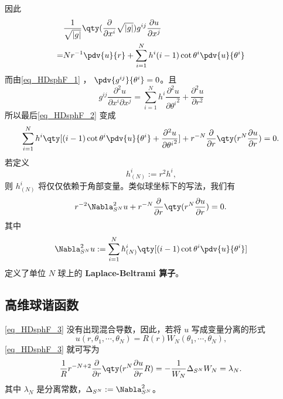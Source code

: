 因此
\begin{equation}
\begin{aligned}
&\frac{1}{\sqrt{ \left\lvert g \right\rvert }} \qty(\frac{\partial }{\partial x^i} \sqrt{ \left\lvert g \right\rvert })g^{ij} \frac{\partial u}{\partial x^j}\\
=&Nr^{-1}\pdv{u}{r}+\sum_{i=1}^{N}h^{i}(i-1)\cot\theta^i\pdv{u}{\theta^i}\\
\end{aligned}~
\end{equation}
而由\autoref{eq_HDsphF_1} ， $\pdv{g^{ij}}{\theta^i}=0$。且
\begin{equation}
g^{ij}\frac{\partial^2 u}{\partial x^i\partial x^j}=\sum_{i=1}^{N}h^{i}\frac{\partial^2 u}{\partial {\theta^i}^2}+\frac{\partial^2 u}{\partial r^2}~
\end{equation}
所以最后\autoref{eq_HDsphF_2} 变成
\begin{equation}
\begin{aligned}
\sum_{i=1}^{N}h^{i}\qty[(i-1)\cot\theta^i\pdv{u}{\theta^i}+\frac{\partial^2 u}{\partial {\theta^i}^2}]+r^{-N}\frac{\partial }{\partial r}\qty(r^{N}\frac{\partial u}{\partial r})=0.
\end{aligned}~
\end{equation}
若定义 
\begin{equation}\label{eq_HDsphF_6}
h^i_{(N)}:=r^2h^i,~
\end{equation}
则 $h^i_{(N)}$ 将仅仅依赖于角部变量。类似球坐标下的写法，我们有
\begin{equation}\label{eq_HDsphF_3}
r^{-2}\Nabla^{2}_{S^N}u+r^{-N}\frac{\partial }{\partial r}\qty(r^{N}\frac{\partial u}{\partial r})=0.~
\end{equation}
其中
\begin{equation}\label{eq_HDsphF_5}
\Nabla^{2}_{S^N}u:=\sum_{i=1}^N h^{i}_{(N)}\qty[(i-1)\cot\theta^i\pdv{u}{\theta^i}]~
\end{equation}
定义了单位 $N$ 球上的 \textbf{Laplace-Beltrami 算子}。
\subsection{高维球谐函数}
\autoref{eq_HDsphF_3} 没有出现混合导数，因此，若将 $u$ 写成变量分离的形式
\begin{equation}
u(r,\theta_1,\cdots,\theta_N)=R(r)W_N(\theta_1,\cdots,\theta_N),~
\end{equation}
\autoref{eq_HDsphF_3} 就可写为
\begin{equation}\label{eq_HDsphF_4}
\frac{1}{R}r^{-N+2}\frac{\partial }{\partial r}\qty(r^{N}\frac{\partial u}{\partial r}R)=-\frac{1}{W_N}\Delta_{S^N}W_N=\lambda_N.~
\end{equation}
其中 $\lambda_N$ 是分离常数，$\Delta_{S^N}:=\Nabla_{S^N}^2$。

